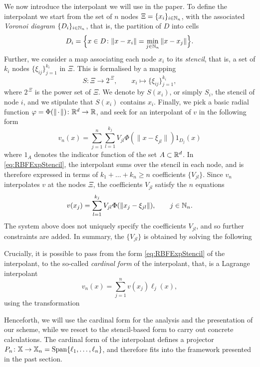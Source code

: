 \documentclass[a4paper]{siamart190516}
\begin{document}
We now introduce the interpolant we will use in the paper. To define the interpolant
we start from the set of $n$ nodes $\Xi = \{ x_i \}_{i \in \mathbb{N}_n}$, with the
associated \textit{Voronoi diagram} $\{ D_i \}_{i \in \mathbb{N}_n}$, that is,
the
partition of $D$ into cells
\[
  D_i = \Bigl\{ x \in D \colon \| x - x_i \| = \min_{j \in \mathbb{N}_n} \| x - x_j \| \Bigr\}.
\]
Further, we consider a map associating each node $x_i$ to its \textit{stencil}, that
is, a set of $k_i$ nodes $\{\xi_{ij} \}_{j = 1}^{k_i}$ in $\Xi$. This is formalised
by a mapping
\[
  S \colon \Xi \to 2^{\,\Xi}, \qquad x_i \mapsto \{ \xi_{ij} \}_{j = 1}^{k_i},
\]
where $2^{\,\Xi}$ is the power set of $\Xi$. We denote by $S(x_i)$, or simply $S_i$,
the stencil of node $i$, and we stipulate that $S(x_i)$ contains $x_i$. Finally, we
pick a basic radial function $\varphi = \Phi( \| {\mkern 2mu\cdot\mkern 2mu} \|) \colon \mathbb{R}^d \to \mathbb{R}$,
and seek for an interpolant of $v$ in the following form
\begin{equation}\label{eq:RBFExpStencil}   
  v_n(x) = \sum_{j = 1}^{n} \sum_{l=1}^{k_j} V_{jl} \Phi(\| x - \xi_{jl} \|) 1_{D_j}(x) 
\end{equation}
where $1_A$ denotes the indicator function of the set $A \subset \mathbb{R}^d$. In
\cref{eq:RBFExpStencil}, the interpolant sums over the stencil in each node, and 
is therefore expressed in terms of $k_1 + \dots + k_n \geq n$ coefficients $\{
V_{jl}\}$. Since $v_n$ interpolates $v$ at the nodes $\Xi$, the coefficients
$V_{jl}$ satisfy the $n$ equations
\[
  v(x_j) = \sum_{l=1}^{k_j} V_{jl} \Phi(\| x_j - \xi_{jl} \|), \qquad j \in \mathbb{N}_n.
\]
The system above does not uniquely specify the coefficients $V_{jl}$, and so further
constraints are added. In summary, the $\{ V_{jl} \}$ is obtained by solving the
following 

Crucially, it is possible to pass from the form \cref{eq:RBFExpStencil} of the
interpolant, to the so-called \textit{cardinal form} of the interpolant, that, is a
Lagrange interpolant
\[
  v_n(x) = \sum_{j=1}^{n} v(x_j) \ell_j(x),
\]
using the transformation

Henceforth, we will use the cardinal form for the analysis and the presentation of
our scheme, while we resort to the stencil-based form to carry out concrete
calculations. The cardinal form of the interpolant defines a projector $P_n \colon \mathbb{X} \to
\mathbb{X}_n = \operatorname{Span} \{ \ell_1, \ldots, \ell_n \}$, and therefore fits into the framework
presented in the past section.
\end{document}
